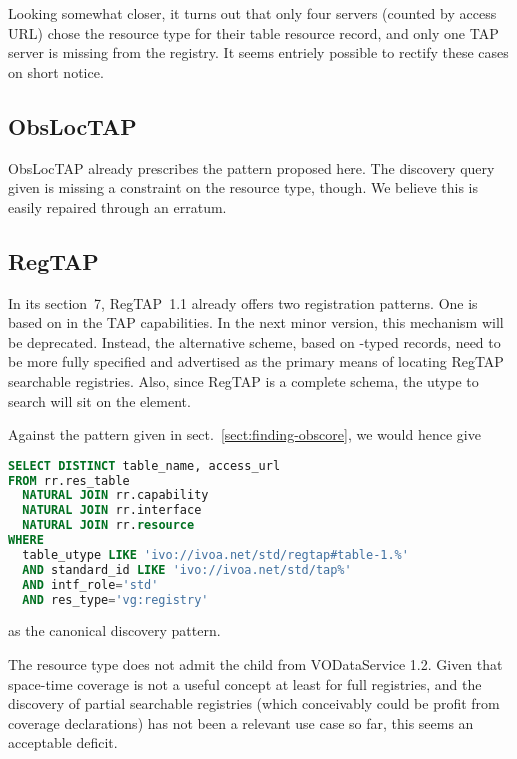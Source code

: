 \documentclass[11pt,a4paper]{ivoa}
\begin{document}
Looking somewhat closer, it turns out that only four servers (counted by
access URL) chose the  resource type for
their table resource record, and only one TAP server is missing from the
registry.  It seems entriely possible to rectify these cases on short
notice.

\subsection{ObsLocTAP}

ObsLocTAP \citep{2021ivoa.spec.0724S} already prescribes the pattern
proposed here. The discovery query given is missing a constraint on the
resource type, though.  We believe this is easily repaired through an
erratum.


\subsection{RegTAP}

In its section~7, RegTAP~1.1 \citep{2019ivoa.spec.1011D} already offers
two registration patterns.  One is based on  in the TAP
capabilities.  In the next minor version, this mechanism will be
deprecated.  Instead, the alternative scheme, based on
-typed records, need to be more fully specified and
advertised as the primary means of locating RegTAP searchable
registries.   Also, since RegTAP is a complete schema, the utype to
search will sit on the  element.

Against the pattern given in sect.~\ref{sect:finding-obscore}, we would hence
give
\begin{lstlisting}[language=SQL]
SELECT DISTINCT table_name, access_url
FROM rr.res_table
  NATURAL JOIN rr.capability
  NATURAL JOIN rr.interface
  NATURAL JOIN rr.resource
WHERE
  table_utype LIKE 'ivo://ivoa.net/std/regtap#table-1.%'
  AND standard_id LIKE 'ivo://ivoa.net/std/tap%'
  AND intf_role='std'
  AND res_type='vg:registry'
\end{lstlisting}
as the canonical discovery pattern.

The  resource type does not admit the
 child from VODataService 1.2.  Given that
space-time coverage is not a useful concept at least for full
registries, and the discovery of partial searchable registries (which
conceivably could be profit from coverage declarations)
has not been a relevant use case so
far, this seems an acceptable deficit.
\end{document}
